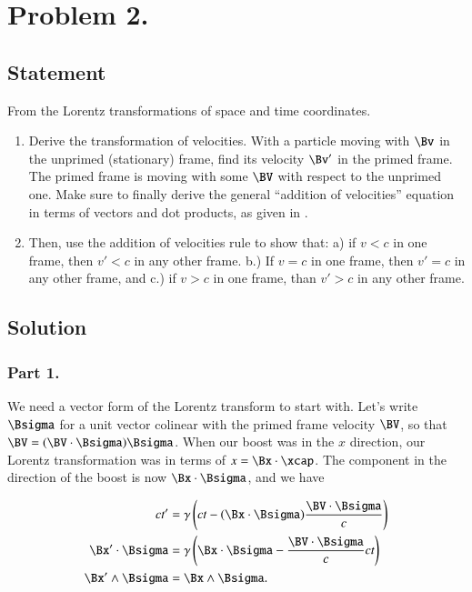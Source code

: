 \section{Problem 2.}
\subsection{Statement}

From the Lorentz transformations of space and time coordinates.

\begin{enumerate}
\item Derive the transformation of velocities.  With a particle moving with $\Bv$ in the unprimed (stationary) frame, find its velocity $\Bv'$ in the primed frame.  The primed frame is moving with some $\BV$ with respect to the unprimed one.  Make sure to finally derive the general ``addition of velocities'' equation in terms of vectors and dot products, as given in \citep{landau1971classical}.
\item Then, use the addition of velocities rule to show that: a) if $v < c$ in one frame, then $v' < c$ in any other frame.  b.) If $v = c$ in one frame, then $v' = c$ in any other frame, and c.) if $v> c$ in one frame, than $v' > c$ in any other frame.
\end{enumerate}

\subsection{Solution}
\subsubsection{Part 1.}

We need a vector form of the Lorentz transform to start with.  Let's write $\Bsigma$ for a unit vector colinear with the primed frame velocity $\BV$, so that $\BV = (\BV \cdot \Bsigma) \Bsigma$.  When our boost was in the $x$ direction, our Lorentz transformation was in terms of $x = \Bx \cdot \xcap$.  The component in the direction of the boost is now $\Bx \cdot \Bsigma$, and we have

\begin{subequations}
\begin{align}\label{eqn:relativisticElectrodynamicsA1:200}
c t' &= \gamma \left( ct - (\Bx \cdot \Bsigma) \frac{\BV \cdot \Bsigma}{c} \right) \\
\Bx' \cdot \Bsigma &= \gamma \left( \Bx \cdot \Bsigma - \frac{\BV \cdot \Bsigma}{c} c t \right) \\
\Bx' \wedge \Bsigma &= \Bx \wedge \Bsigma .
\end{align}
\end{subequations}

